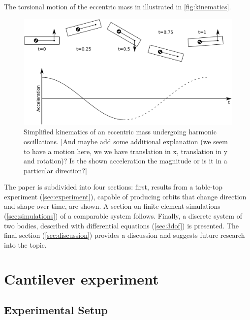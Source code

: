 \documentclass{article}
\begin{document}
The torsional motion of the eccentric mass in illustrated in \autoref{fig:kinematics}.

\begin{figure}[ht!]
    \centering
    \includegraphics[width=0.7\linewidth]{figures/kinematics_2.pdf}
    \caption{Simplified kinematics of an eccentric mass undergoing harmonic oscillations. [And maybe add some additional explanation (we seem to have a motion here, we we have translation in x, translation in y and rotation)? Is the shown acceleration the magnitude or is it in a particular direction?]}
    \label{fig:kinematics}
\end{figure}

The paper is subdivided into four sections: first, results from a table-top experiment (\autoref{sec:experiment}), capable of producing orbits that change direction and shape over time, are shown. A section on finite-element-simulations (\autoref{sec:simulations}) of a comparable system follows. Finally, a discrete system of two bodies, described with differential equations (\autoref{sec:3dof}) is presented. The final section (\autoref{sec:discussion}) provides a discussion and suggests future research into the topic. 

\clearpage

\section{Cantilever experiment}
\label{sec:experiment}

\subsection{Experimental Setup}
\end{document}
